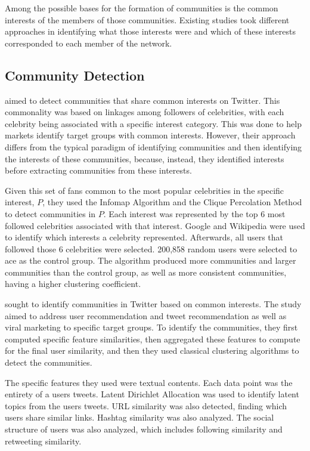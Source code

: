 Among the possible bases for the formation of communities is the common interests of the members of those communities. Existing studies took different approaches in identifying what those interests were and which of these interests corresponded to each member of the network.


\subsection{Community Detection}


 aimed to detect communities that share common interests on Twitter. This commonality was based on linkages among followers of celebrities, with each celebrity being associated with a specific interest category. This was done to help markets identify target groups with common interests. However, their approach differs from the typical paradigm of identifying communities and then identifying the interests of these communities, because, instead, they identified interests before extracting communities from these interests.


Given this set of fans common to the most popular celebrities in the specific interest, $P$, they used the Infomap Algorithm and the Clique Percolation Method to detect communities in $P$. Each interest was represented by the top 6 most followed celebrities associated with that interest. Google and Wikipedia were used to identify which interests a celebrity represented. Afterwards, all users that followed those 6 celebrities were selected. 200,858 random users were selected to ace as the control group. The algorithm produced more communities and larger communities than the control group, as well as more consistent communities, having a higher clustering coefficient. 


 sought to identify communities in Twitter based on common interests. The study aimed to address user recommendation and tweet recommendation as well as viral marketing to specific target groups. To identify the communities, they first computed specific feature similarities, then aggregated these features to compute for the final user similarity, and then they used classical clustering algorithms to detect the communities.


The specific features they used were textual contents. Each data point was the entirety of a user\vtick s tweets. Latent Dirichlet Allocation was used to identify latent topics from the user\vtick s tweets. URL similarity was also detected, finding which users share similar links. Hashtag similarity was also analyzed. The social structure of users was also analyzed, which includes following similarity and retweeting similarity. 


